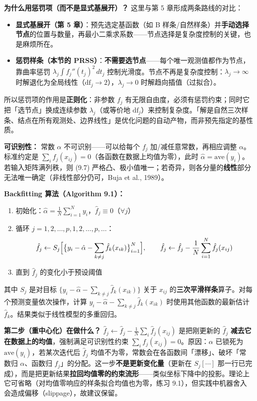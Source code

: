 \textbf{为什么用惩罚项（而不是显式基展开）？} 这里与第 5 章形成两条路线的对比：
\begin{itemize}
    \item \textbf{显式基展开（第 5 章）}：预先选定基函数（如 B 样条/自然样条）并\textbf{手动选择节点}的位置与数量，再最小二乘求系数——节点选择是复杂度控制的关键，也是麻烦所在。
    \item \textbf{惩罚样条（本节的 PRSS）}：\textbf{不需要选节点}——每个唯一观测值都作为节点，靠曲率惩罚 $\lambda_j \int f_j''(t_j)^2\,dt_j$ 控制光滑度。节点不再是复杂度控制：$\lambda_j \to \infty$ 时解退化为全局线性（$\mathrm{df}_j \to 2$），$\lambda_j \to 0$ 时解趋向插值（过拟合）。
\end{itemize}
所以惩罚项的作用是\textbf{正则化}：非参数 $f_j$ 有无限自由度，必须有惩罚约束；同时它把「选节点」换成连续参数 $\lambda_j$（或等价地 $\mathrm{df}_j$）来控制复杂度。「解是自然三次样条、结点在所有观测处、边界线性」是优化问题的自动产物，而非预先指定的基性质。

\textbf{可识别性：} 常数 $\alpha$ 不可识别——可以给每个 $f_j$ 加/减任意常数，再相应调整 $\alpha$。标准约定是 $\sum_i f_j(x_{ij}) = 0$（各函数在数据上均值为零），此时 $\hat\alpha = \mathrm{ave}(y_i)$。若输入矩阵满列秩，则 (9.7) 严格凸、极小值唯一；若奇异，则各分量的\textbf{线性}部分无法唯一确定（非线性部分仍可，Buja et al., 1989）。

\textbf{Backfitting 算法（Algorithm 9.1）：}
\begin{enumerate}
    \item 初始化：$\hat\alpha = \frac{1}{N}\sum_{i=1}^{N} y_i$，$\hat f_j \equiv 0$（$\forall j$）
    \item 循环 $j = 1, 2, \ldots, p, 1, 2, \ldots, p, \ldots$：
    \[
        \hat f_j \leftarrow S_j\Bigl[\bigl\{y_i - \hat\alpha - \sum_{k\neq j}\hat f_k(x_{ik})\bigr\}_{i=1}^{N}\Bigr],\qquad
        \hat f_j \leftarrow \hat f_j - \frac{1}{N}\sum_{i=1}^{N}\hat f_j(x_{ij})
    \]
    \item 直到 $\hat f_j$ 的变化小于预设阈值
\end{enumerate}
其中 $S_j$ 是对目标 $\{y_i - \hat\alpha - \sum_{k\neq j}\hat f_k(x_{ik})\}$ 关于 $x_{ij}$ 的\textbf{三次平滑样条}算子。对每个预测变量依次操作，计算 $y_i - \hat\alpha - \sum_{k\neq j}\hat f_k(x_{ik})$ 时使用其他函数的最新估计 $\hat f_k$。结果类似于线性模型的多重回归。

\textbf{第二步（重中心化）在做什么？} $\hat f_j \leftarrow \hat f_j - \frac{1}{N}\sum_i \hat f_j(x_{ij})$ 是把刚更新的 $\hat f_j$ \textbf{减去它在数据上的均值}，强制满足可识别性约束 $\sum_i f_j(x_{ij}) = 0$。原因：$\alpha$ 已锁死为 $\mathrm{ave}(y_i)$，若某次迭代后 $\hat f_j$ 均值不为零，常数会在各函数间「漂移」、破坏「常数归 $\alpha$、函数归 $f_j$」的分配。这一步\textbf{不是更新变化量}（更新在 $S_j[\cdots]$ 那一行已完成），而是把更新结果\textbf{拉回均值零的约束流形}——类似坐标下降中的投影。理论上它可省略（对均值零响应的样条拟合均值也为零，练习 9.1），但实践中机器舍入会造成偏移（slippage），故建议保留。

